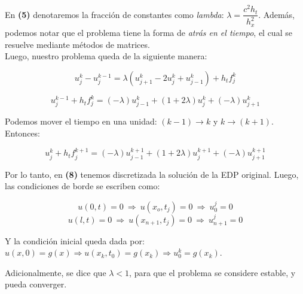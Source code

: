 \documentclass[12pt,letterpaper]{article}
\begin{document}
En \textbf{(5)} denotaremos la fracción de constantes como \textit{lambda}: $\lambda = \dfrac{c^2h_t}{h^2_x}$. Además, podemos notar que el problema tiene la forma de \textit{atrás en el tiempo}, el cual se resuelve mediante métodos de matrices.\\

Luego, nuestro problema queda de la siguiente manera:

\begin{equation}u_j^{k} - u_j^{k-1} = \lambda (u_{j+1}^k - 2u_j^k + u_{j-1}^k) + h_tf_j^k\end{equation}

\begin{equation}u_j^{k-1} + h_tf_j^k = (-\lambda)u_{j-1}^k + (1+2\lambda)u_j^k + (-\lambda)u_{j+1}^k\end{equation}

Podemos mover el tiempo en una unidad: $(k-1) \rightarrow k$ y $k \rightarrow (k+1)$. Entonces:

\begin{equation}u_j^k + h_tf_j^{k+1} = (-\lambda)u_{j-1}^{k+1} + (1+2\lambda)u_j^{k+1} + (-\lambda)u_{j+1}^{k+1}\end{equation}

Por lo tanto, en \textbf{(8)} tenemos discretizada la solución de la EDP original. Luego, las condiciones de borde se escriben como:

\begin{equation*}u(0,t)=0\ \Rightarrow\ u(x_o,t_j)=0\ \Rightarrow\ u_0^j=0 \end{equation*}
\begin{equation*}u(l,t)=0\ \Rightarrow\ u(x_{n+1},t_j)=0\ \Rightarrow\ u_{n+1}^j=0 \end{equation*}

Y la condición inicial queda dada por: $u(x,0)=g(x) \Rightarrow u(x_k,t_0)=g(x_k) \Rightarrow u_0^k=g(x_k)$.

Adicionalmente, se dice que $\lambda<1$, para que el problema se considere estable, y pueda converger.\\
\end{document}

